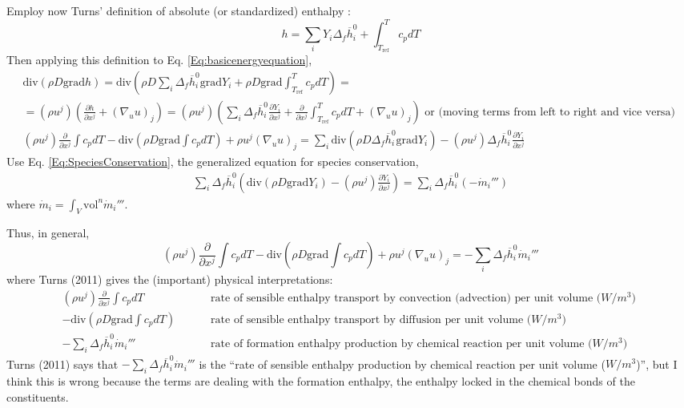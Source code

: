 \documentclass[10pt]{amsart}
\begin{document}
\begin{multicols*}{2}
Employ now Turns' definition of absolute (or standardized) enthalpy \cite{STurns2011}:
\[
h = \sum_i Y_i \Delta_f \overline{h}_i^0 +\int_{T_{\text{ref}}}^T c_p dT
\]
Then applying this definition to Eq. \ref{Eq:basicenergyequation},
\[
\begin{gathered}
  \text{div}(\rho D \text{grad}h ) = \text{div}\left( \rho D \sum_i \Delta_f \overline{h}_i^0 \text{grad}Y_i + \rho D \text{grad} \int_{T_{\text{ref}}}^T c_pdT  \right)  = \\
  = (\rho u^j) \left( \frac{ \partial h}{ \partial x^j} + (\nabla_u u)_j \right) = (\rho u^j) \left( \sum_i \Delta_f \overline{h}_i^0 \frac{ \partial Y_i}{ \partial x^j} + \frac{ \partial }{ \partial x^j} \int_{T_{\text{ref}}}^T c_p dT + (\nabla_u u)_j \right) \text{ or (moving terms from left to right and vice versa) } \\ 
  (\rho u^j) \frac{ \partial }{ \partial x^j} \int c_p dT - \text{div}(\rho D\text{grad} \int c_p dT ) + \rho u^j (\nabla_u u)_j = \sum_i \text{div}(\rho D\Delta_f \overline{h}_i^0 \text{grad}Y_i ) - (\rho u^j) \Delta_f \overline{h}_i^0 \frac{ \partial Y_i}{ \partial x^j}
\end{gathered}
\]
Use Eq. \ref{Eq:SpeciesConservation}, the generalized equation for species conservation, 
\[
\begin{gathered}
  \sum_i \Delta_f \overline{h}_i^0 (\text{div}(\rho D\text{grad}Y_i) - (\rho u^j) \frac{ \partial Y_i}{ \partial x^j}) = \sum_i \Delta_f \overline{h}_i^0 (-\dot{m}_i''')
\end{gathered}
\]
where $\dot{m}_i = \int_V \text{vol}^n \dot{m}_i'''$.  

Thus, in general,
\begin{equation}
  \boxed{   (\rho u^j) \frac{ \partial }{ \partial x^j} \int c_p dT - \text{div}(\rho D\text{grad} \int c_p dT ) + \rho u^j (\nabla_u u)_j = -\sum_i \Delta_f \overline{h}_i^0 \dot{m}_i''' }
\end{equation}
where Turns (2011) \cite{STurns2011} gives the (important) physical interpretations:
\[
\begin{aligned}
  (\rho u^j) \frac{ \partial }{ \partial x^j} \int c_p dT & \qquad \text{ rate of sensible enthalpy transport by convection (advection) per unit volume ($W/m^3$)  } \\ 
- \text{div}(\rho D\text{grad} \int c_p dT )  & \qquad \text{ rate of sensible enthalpy transport by diffusion per unit volume ($W/m^3$)  } \\ 
-\sum_i \Delta_f \overline{h}_i^0 \dot{m}_i'''   & \qquad \text{ rate of formation enthalpy production by chemical reaction per unit volume ($W/m^3$) } 
\end{aligned}
\]
Turns (2011) \cite{STurns2011} says that $-\sum_i \Delta_f \overline{h}_i^0 \dot{m}_i'''$ is the ``rate of sensible enthalpy production by chemical reaction per unit volume ($W/m^3$)'', but I think this is wrong because the terms are dealing with the formation enthalpy, the enthalpy locked in the chemical bonds of the constituents.  


\end{multicols*}
\end{document}
